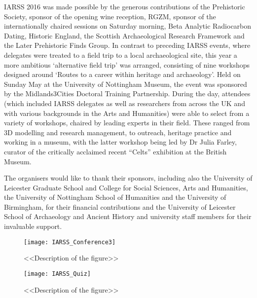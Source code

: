 \documentclass[ngerman,english]{ijsra}
\begin{document}
IARSS 2016 was made possible by the generous contributions of the Prehistoric Society, sponsor of the opening wine reception, 
RGZM, 
sponsor of the internationally chaired sessions on Saturday morning, 
Beta Analytic Radiocarbon Dating, Historic England, the Scottish Archaeological Research Framework and the Later Prehistoric Finds Group. 
In contrast to preceding IARSS events, where delegates were treated to a field trip to a local archaeological site, this year a more ambitious ‘alternative field trip’ was arranged, consisting of nine workshops designed around ‘Routes to a career within heritage and archaeology’. 
Held on Sunday  May at the University of Nottingham Museum, the event was sponsored by the Midlands3Cities Doctoral Training Partnership. 
During the day, attendees (which included IARSS delegates as well as researchers from across the UK and with various backgrounds in the Arts and Humanities) were able to select from a variety of workshops, chaired by leading experts in their field. These ranged from 3D modelling and research management, to outreach, heritage practice and working in a museum, with the latter workshop being led by Dr Julia Farley, curator of the critically acclaimed recent \enquote{Celts} exhibition at the British Museum.

The organisers would like to thank their sponsors, including also the University of Leicester Graduate School and College for Social Sciences, Arts and Humanities, the University of Nottingham School of Humanities and the University of Birmingham, for their financial contributions and the University of Leicester School of Archaeology and Ancient History and university staff members for their invaluable support. 


\begin{figure}[!p]
\texttt{[image: IARSS\_Conference3]}
\caption{<<Description of the figure>>}
\label{fig:IARSS_Conference3}

\texttt{[image: IARSS\_Quiz]}
\caption{<<Description of the figure>>}
\label{fig:IARSS_Quiz}
\end{figure} 

\IJSRAclosing%
\end{document}
